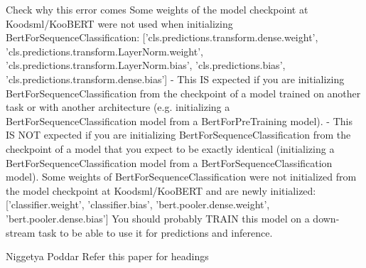 Check why this error comes
	Some weights of the model checkpoint at Koodsml/KooBERT were not used when initializing BertForSequenceClassification: ['cls.predictions.transform.dense.weight', 'cls.predictions.transform.LayerNorm.weight', 'cls.predictions.transform.LayerNorm.bias', 'cls.predictions.bias', 'cls.predictions.transform.dense.bias']
	- This IS expected if you are initializing BertForSequenceClassification from the checkpoint of a model trained on another task or with another architecture (e.g. initializing a BertForSequenceClassification model from a BertForPreTraining model).
	- This IS NOT expected if you are initializing BertForSequenceClassification from the checkpoint of a model that you expect to be exactly identical (initializing a BertForSequenceClassification model from a BertForSequenceClassification model).
	Some weights of BertForSequenceClassification were not initialized from the model checkpoint at Koodsml/KooBERT and are newly initialized: ['classifier.weight', 'classifier.bias', 'bert.pooler.dense.weight', 'bert.pooler.dense.bias']
	You should probably TRAIN this model on a down-stream task to be able to use it for predictions and inference.

Niggetya Poddar
    Refer this paper for headings
